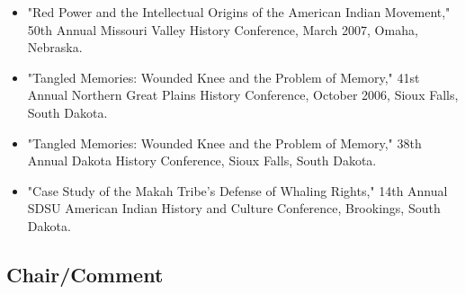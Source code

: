 \documentclass[10pt]{article}
\begin{document}
\begin{itemize}
  \item "Red Power and the Intellectual Origins of the American Indian Movement," 50th Annual Missouri Valley History Conference, March 2007, Omaha, Nebraska.
  
  \item "Tangled Memories: Wounded Knee and the Problem of Memory," 41st Annual Northern Great Plains History Conference, October 2006, Sioux Falls, South Dakota.
  
  \item "Tangled Memories: Wounded Knee and the Problem of Memory," 38th Annual Dakota History Conference, Sioux Falls, South Dakota.
  
  \item "Case Study of the Makah Tribe's Defense of Whaling Rights," 14th Annual SDSU American Indian History and Culture Conference, Brookings, South Dakota.
\end{itemize}

\subsection*{Chair/Comment}
\end{document}
